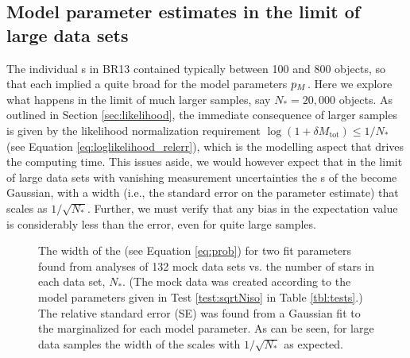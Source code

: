 \subsection{Model parameter estimates in the limit of large data sets} \label{sec:largedata}

The individual \MAP{}s in BR13 contained typically between 100 and 800 objects, so that each \MAP{} implied a quite broad \pdf{} for the model parameters $p_M{}$. Here we explore what happens in the limit of much larger samples, say $N_{*} = 20,000$ objects.  As outlined in Section \ref{sec:likelihood}, the immediate consequence of larger samples is given by the likelihood normalization requirement $\log(1+\delta M_\text{tot})\le 1/N_{*}$ (see Equation \ref{eq:loglikelihood_relerr}), which is the modelling aspect that drives the computing time. This issues aside, we would however expect that in the limit of large data sets with vanishing measurement uncertainties the \pdf{}s of the \pmodel{} become Gaussian, with a \pdf{} width (i.e., the standard error on the parameter estimate) that scales as $1/\sqrt{N_{*}}$. Further, we must verify that any bias in the \pdf{} expectation value is considerably less than the error, even for quite large samples.



\begin{figure}[!htbp]
\caption{The width of the \pdf{} (see Equation \ref{eq:prob}) for two fit parameters found from analyses of 132 mock data sets vs. the number of stars in each data set, $N_{*}$. (The mock data was created according to the model parameters given in Test \ref{test:sqrtNiso} in Table \ref{tbl:tests}.) The relative standard error (SE) was found from a Gaussian fit to the marginalized \pdf{} for each model parameter. As can be seen, for large data samples the width of the \pdf{} scales with $1/\sqrt{N_{*}}$ as expected.} 
\label{fig:sqrtNiso}
\end{figure}




